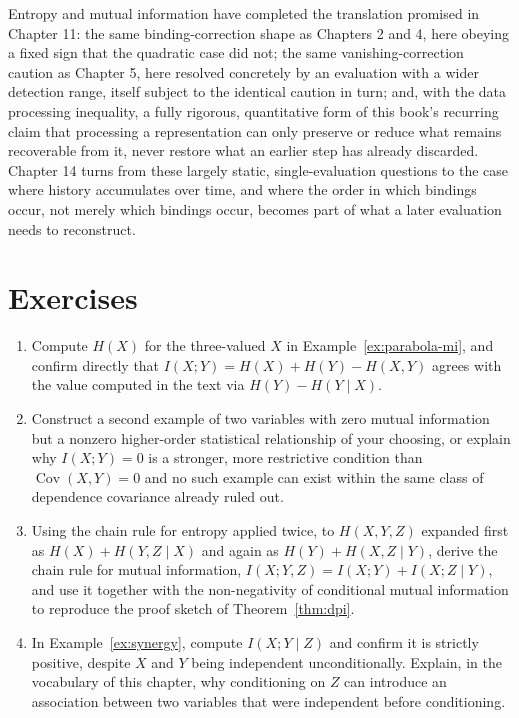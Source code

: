 \documentclass[11pt]{book}
\begin{document}
Entropy and mutual information have completed the translation promised in Chapter 11: the same binding-correction shape as Chapters 2 and 4, here obeying a fixed sign that the quadratic case did not; the same vanishing-correction caution as Chapter 5, here resolved concretely by an evaluation with a wider detection range, itself subject to the identical caution in turn; and, with the data processing inequality, a fully rigorous, quantitative form of this book's recurring claim that processing a representation can only preserve or reduce what remains recoverable from it, never restore what an earlier step has already discarded. Chapter 14 turns from these largely static, single-evaluation questions to the case where history accumulates over time, and where the order in which bindings occur, not merely which bindings occur, becomes part of what a later evaluation needs to reconstruct.

\section*{Exercises}
\begin{enumerate}
\item Compute $H(X)$ for the three-valued $X$ in Example~\ref{ex:parabola-mi}, and confirm directly that $I(X;Y)=H(X)+H(Y)-H(X,Y)$ agrees with the value computed in the text via $H(Y)-H(Y\mid X)$.
\item Construct a second example of two variables with zero mutual information but a nonzero higher-order statistical relationship of your choosing, or explain why $I(X;Y)=0$ is a stronger, more restrictive condition than $\operatorname{Cov}(X,Y)=0$ and no such example can exist within the same class of dependence covariance already ruled out.
\item Using the chain rule for entropy applied twice, to $H(X,Y,Z)$ expanded first as $H(X)+H(Y,Z\mid X)$ and again as $H(Y)+H(X,Z\mid Y)$, derive the chain rule for mutual information, $I(X;Y,Z)=I(X;Y)+I(X;Z\mid Y)$, and use it together with the non-negativity of conditional mutual information to reproduce the proof sketch of Theorem~\ref{thm:dpi}.
\item In Example~\ref{ex:synergy}, compute $I(X;Y\mid Z)$ and confirm it is strictly positive, despite $X$ and $Y$ being independent unconditionally. Explain, in the vocabulary of this chapter, why conditioning on $Z$ can introduce an association between two variables that were independent before conditioning.
\end{enumerate}
\end{document}
